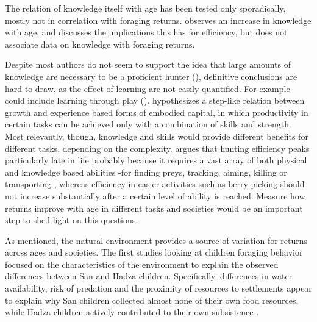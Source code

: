 The relation of knowledge itself with age has been tested only sporadically, mostly not in correlation with foraging returns.%
\cite{koster_wisdom_2016} observes an increase in knowledge with age, and discusses the implications this has for efficiency, but does not associate data on knowledge with foraging returns.

Despite most authors do not seem to support the idea that large amounts of knowledge are necessary to be a proficient hunter (\cite{blurton_jones_why_1997, bird_children_2002, bird_mardu_2005}), definitive conclusions are hard to draw, as the effect of learning are not easily quantified. 
For example could include learning through play (\cite{bock_subsistence_2004}).%
\cite{bock_evolutionary_2002} hypothesizes a step-like relation between growth and experience based forms of embodied capital, in which productivity in certain tasks can be achieved only with a combination of skills and strength. 
Most relevantly, though, knowledge and skills would provide different benefits for different tasks, depending on the complexity. \cite{koster_life_2020} argues that hunting efficiency peaks particularly late in life probably because it requires a vast array of both physical and knowledge based abilities -for finding preys, tracking, aiming, killing or transporting-, whereas efficiency in easier activities such as berry picking should not increase substantially after a certain level of ability is reached. 
Measure how returns improve with age in different tasks and societies would be an important step to shed light on this questions.


As mentioned, the natural environment provides a source of variation for returns across ages and societies. The first studies looking at children foraging behavior focused on the characteristics of the environment to explain the observed differences between San and Hadza children. Specifically, differences in water availability, risk of predation and the proximity of resources to settlements appear to explain why San children collected almost none of their own food resources, while Hadza children actively contributed to their own subsistence \cite{blurton_jones_differences_1994}. %

